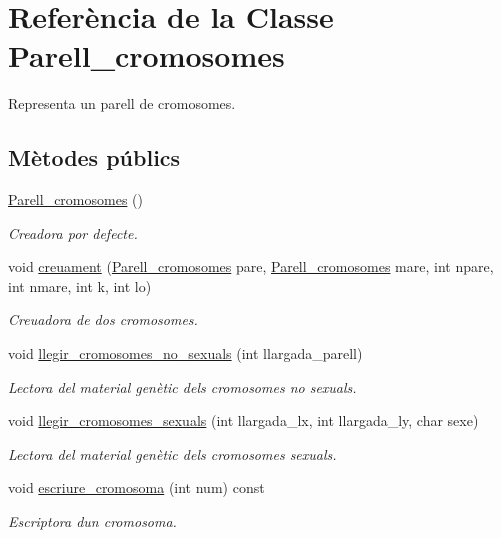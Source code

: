 \hypertarget{class_parell__cromosomes}{}\section{Referència de la Classe Parell\+\_\+cromosomes}
\label{class_parell__cromosomes}


Representa un parell de cromosomes.  


\subsection*{Mètodes públics}
\begin{DoxyCompactItemize}
\item 
\hyperlink{class_parell__cromosomes_a7985c1aa62522044b5e713e065d91463}{Parell\+\_\+cromosomes} ()
\begin{DoxyCompactList}\small\item\em Creadora por defecte. \end{DoxyCompactList}\item 
void \hyperlink{class_parell__cromosomes_a4be1f5db491e742fa2ced6a22442c0a2}{creuament} (\hyperlink{class_parell__cromosomes}{Parell\+\_\+cromosomes} pare, \hyperlink{class_parell__cromosomes}{Parell\+\_\+cromosomes} mare, int npare, int nmare, int k, int lo)
\begin{DoxyCompactList}\small\item\em Creuadora de dos cromosomes. \end{DoxyCompactList}\item 
void \hyperlink{class_parell__cromosomes_a5d96548d03bc22d40125a76c5654b3cd}{llegir\+\_\+cromosomes\+\_\+no\+\_\+sexuals} (int llargada\+\_\+parell)
\begin{DoxyCompactList}\small\item\em Lectora del material genètic dels cromosomes no sexuals. \end{DoxyCompactList}\item 
void \hyperlink{class_parell__cromosomes_a63a4bff5f37c05ff7b6834ff48b4ceba}{llegir\+\_\+cromosomes\+\_\+sexuals} (int llargada\+\_\+lx, int llargada\+\_\+ly, char sexe)
\begin{DoxyCompactList}\small\item\em Lectora del material genètic dels cromosomes sexuals. \end{DoxyCompactList}\item 
void \hyperlink{class_parell__cromosomes_a3279b69d2e17094515eb9ac1f3f0cd72}{escriure\+\_\+cromosoma} (int num) const 
\begin{DoxyCompactList}\small\item\em Escriptora d\textquotesingle{}un cromosoma. \end{DoxyCompactList}\end{DoxyCompactItemize}
